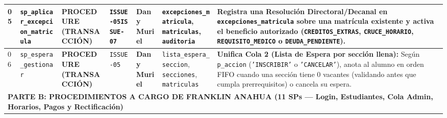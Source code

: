 \documentclass[10pt,a4paper,landscape]{article}
\newcommand{\objProcTx}{\textbf{\textcolor{unjbgNavy}{PROCEDURE (TRANSACCIÓN)}}}
\newcommand{\devDany}{\textbf{\textcolor{unjbgNavy}{Dany Muriel}} \newline {\scriptsize(Lead / QA)}}
\begin{document}
\begin{longtable}{|p{0.5cm}|p{4.8cm}|p{3.3cm}|p{1.9cm}|p{2.5cm}|p{4.2cm}|p{8.0cm}|}
\hline
05 & \texttt{sp\_aplicar\_excepcion\_matricula} & \objProcTx & \texttt{ISSUE-05}\newline \texttt{ISSUE-07} & \devDany & \texttt{excepciones\_matricula}, \texttt{matriculas}, \texttt{auditoria} & Registra una Resolución Directoral/Decanal en \texttt{excepciones\_matricula} sobre una matrícula existente y activa el beneficio autorizado (\texttt{CREDITOS\_EXTRAS}, \texttt{CRUCE\_HORARIO}, \texttt{REQUISITO\_MEDICO} o \texttt{DEUDA\_PENDIENTE}). \\
\hline
\rowcolor{rowAlt}
06 & \texttt{sp\_espera\_gestionar} & \objProcTx & \texttt{ISSUE-05} & \devDany & \texttt{lista\_espera\_seccion}, \texttt{secciones}, \texttt{matriculas} & \textbf{Unifica Cola 2 (Lista de Espera por sección llena):} Según \texttt{p\_accion} (\texttt{'INSCRIBIR'} o \texttt{'CANCELAR'}), anota al alumno en orden FIFO cuando una sección tiene 0 vacantes (validando antes que cumpla prerrequisitos) o cancela su espera. \\
\hline

\multicolumn{7}{|l|}{\cellcolor{badgeFranklin}\textbf{\textcolor{unjbgNavy}{PARTE B: PROCEDIMIENTOS A CARGO DE FRANKLIN ANAHUA (11 SPs — Login, Estudiantes, Cola Admin, Horarios, Pagos y Rectificación)}}} \\
\hline


\end{longtable}
\end{document}

